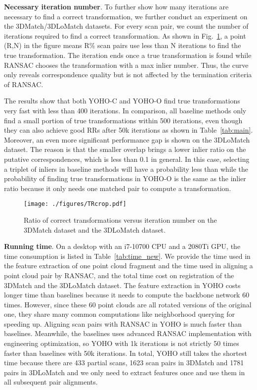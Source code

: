 



\textbf{Necessary iteration number}. To further show how many iterations are necessary to find a correct transformation, we further conduct an experiment on the 3DMatch/3DLoMatch datasets. For every scan pair, we count the number of iterations required to find a correct transformation. As shown in Fig.~\ref{fig:TR}, a point (R,N) in the figure means R\% scan pairs use less than N iterations to find the true transformation. 
The iteration ends once a true transformation is found while RANSAC chooses the transformation with a max inlier number. Thus, the curve only reveals correspondence quality but is not affected by the termination criteria of RANSAC. 

The results show that both YOHO-C and YOHO-O find true transformations very fast with less than 400 iterations. In comparison, all baseline methods only find a small portion of true transformations within 500 iterations, even though they can also achieve good RRs after 50k iterations as shown in Table~\ref{tab:main}. 
Moreover, an even more significant performance gap is shown on the 3DLoMatch dataset. The reason is that the smaller overlap brings a lower inlier ratio on the putative correspondences, which is less than 0.1 in general. In this case, selecting a triplet of inliers in baseline methods will have a probability less than  while the probability of finding true transformations in YOHO-O is the same as the inlier ratio because it only needs one matched pair to compute a transformation.


\begin{figure}
\begin{center}
\texttt{[image: ./figures/TRcrop.pdf]}
\vspace{-15pt}
\end{center}
   \caption{Ratio of correct transformations versus iteration number on the 3DMatch dataset and the 3DLoMatch dataset.}
\label{fig:TR}
\vspace{-15pt}
\end{figure}


\textbf{Running time}.
On a desktop with an i7-10700 CPU and a 2080Ti GPU, the time consumption is listed in Table~\ref{tab:time_new}. We provide the time  used in the feature extraction of one point cloud fragment and the time  used in aligning a point cloud pair by RANSAC, and the total time cost  on registration of the 3DMatch and the 3DLoMatch dataset. The feature extraction in YOHO costs longer time than baselines because it needs to compute the backbone network 60 times. 
However, since these 60 point clouds are all rotated versions of the original one, they share many common computations like neighborhood querying for speeding up. 
Aligning scan pairs with RANSAC in YOHO is much faster than baselines. Meanwhile, the baselines uses advanced RANSAC implementation with engineering optimization, so YOHO with 1k iterations is not strictly 50 times faster than baselines with 50k iterations. In total, YOHO still takes the shortest time because there are 433 partial scans, 1623 scan pairs in 3DMatch and 1781 pairs in 3DLoMatch and we only need to extract features once and use them in all subsequent pair alignments.

